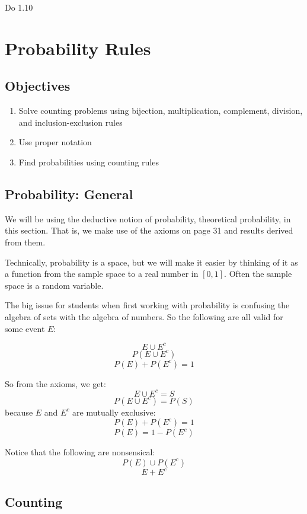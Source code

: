 \documentclass[]{book}
\providecommand{\tightlist}{%
  \setlength{\itemsep}{0pt}\setlength{\parskip}{0pt}}
\theoremstyle{definition}
\theoremstyle{definition}
\theoremstyle{definition}
\theoremstyle{remark}
\begin{document}
Do 1.10

\section{Probability Rules}\label{L5}

\subsection{Objectives}\label{objectives-4}

\begin{enumerate}
\def\labelenumi{\arabic{enumi}.}
\tightlist
\item
  Solve counting problems using bijection, multiplication, complement,
  division, and inclusion-exclusion rules\\
\item
  Use proper notation\\
\item
  Find probabilities using counting rules
\end{enumerate}

\subsection{Probability: General}\label{probability-general}

We will be using the deductive notion of probability, theoretical
probability, in this section. That is, we make use of the axioms on page
31 and results derived from them.

Technically, probability is a space, but we will make it easier by
thinking of it as a function from the sample space to a real number in
\([0,1]\). Often the sample space is a random variable.

The big issue for students when first working with probability is
confusing the algebra of sets with the algebra of numbers. So the
following are all valid for some event \(E\):

\[ E \cup E^c  \] \[P(E \cup E^c)\] \[P(E)+P(E^c)=1\]

So from the axioms, we get: \[E \cup E^c = S \] \[P(E \cup E^c)=P(S)\]
because \(E\) and \(E^c\) are mutually exclusive: \[P(E)+P(E^c)=1\]
\[P(E)=1-P(E^c)\]

Notice that the following are nonsensical: \[P(E) \cup P(E^c)\]
\[E + E^c\]

\subsection{Counting}\label{counting}
\end{document}
